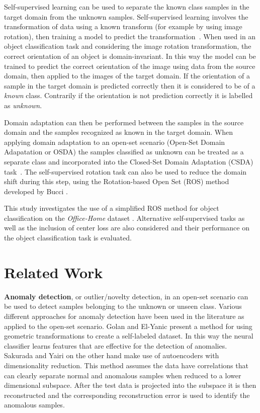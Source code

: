 \documentclass[10pt,twocolumn,letterpaper]{article}
\begin{document}
Self-supervised learning can be used to separate the known class samples in the target domain from the unknown samples. Self-supervised learning involves the transformation of data using a known transform (for example by using image rotation), then training a model to predict the transformation~\cite{Xu2019}. When used in an object classification task and considering the image rotation transformation, the correct orientation of an object is domain-invariant. In this way the model can be trained to predict the correct orientation of the image using data from the source domain, then applied to the images of the target domain. If the orientation of a sample in the target domain is predicted correctly then it is considered to be of a \textit{known} class. Contrarily if the orientation is not prediction correctly it is labelled as \textit{unknown}. 

Domain adaptation can then be performed between the samples in the source domain and the samples recognized as known in the target domain. When applying domain adaptation to an open-set scenario (Open-Set Domain Adapatation or OSDA) the samples classified as unknown can be treated as a separate class and incorporated into the Closed-Set Domain Adaptation (CSDA) task~\cite{Pau2020}. The self-supervised rotation task can also be used to reduce the domain shift during this step, using the Rotation-based Open Set (ROS) method developed by Bucci \etal \cite{Bucci2020}.

This study investigates the use of a simplified ROS method for object classification on the \textit{Office-Home} dataset \cite{OfficeHome}. Alternative self-supervised tasks as well as the inclusion of center loss are also considered and their performance on the object classification task is evaluated.


\section{Related Work}
\label{sec:relatedWork}

\textbf{Anomaly detection}, or outlier/novelty detection, in an open-set scenario can be used to detect samples belonging to the unknown or unseen class. Various different approaches for anomaly detection have been used in the literature as applied to the open-set scenario. Golan and El-Yanic \cite{Golan2018} present a method for using geometric transformations to create a self-labeled dataset. In this way the neural classifier learns features that are effective for the detection of anomalies.  Sakurada and Yairi \cite{Sakurada2014} on the other hand make use of autoencoders with dimensionality reduction. This method assumes the data have correlations that can clearly separate normal and anomalous samples when reduced to a lower dimensional subspace. After the test data is projected into the subspace it is then reconstructed and the corresponding reconstruction error is used to identify the anomalous samples.
\end{document}
